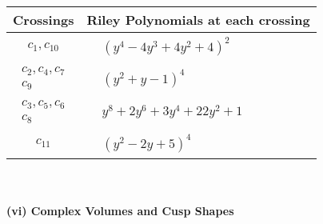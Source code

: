 \documentclass[1p]{elsarticle_modified}
\theoremstyle{definition}
\begin{document}
\begin{tabular}{m{50pt}|m{274pt}}
Crossings & \hspace{64pt}Riley Polynomials at each crossing \\
\hline $$\begin{aligned}c_{1},c_{10}\end{aligned}$$&$\begin{aligned}
&(y^4-4 y^3+4 y^2+4)^2
\end{aligned}$\\
\hline $$\begin{aligned}c_{2},c_{4},c_{7}\\c_{9}\end{aligned}$$&$\begin{aligned}
&(y^2+y-1)^4
\end{aligned}$\\
\hline $$\begin{aligned}c_{3},c_{5},c_{6}\\c_{8}\end{aligned}$$&$\begin{aligned}
&y^8+2 y^6+3 y^4+22 y^2+1
\end{aligned}$\\
\hline $$\begin{aligned}c_{11}\end{aligned}$$&$\begin{aligned}
&(y^2-2 y+5)^4
\end{aligned}$\\
\hline
\end{tabular}\\~\\
\newpage\flushleft \textbf{(vi) Complex Volumes and Cusp Shapes}
\end{document}
